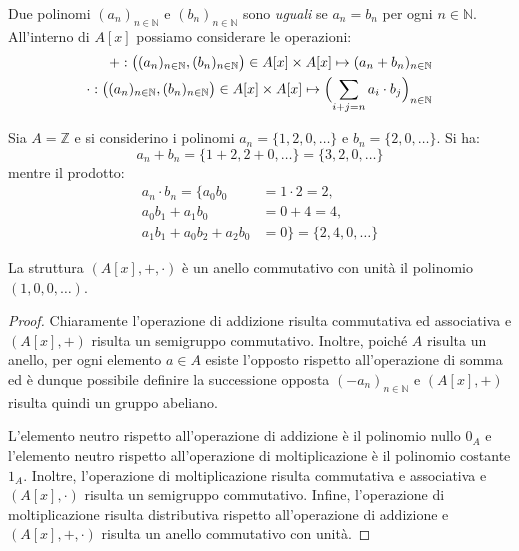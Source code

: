 Due polinomi $(a_{n})_{n \in \mathbb{N}}$ e $(b_{n})_{n \in \mathbb{N}}$ sono
\textit{uguali} se $a_{n} = b_{n}$ per ogni $n \in \mathbb{N}$. All'interno di $A[x]$ possiamo considerare le operazioni:
\begin{eqnarray}
	+: \bigl((a_{n})_{n \in \mathbb{N}},(b_{n})_{n \in \mathbb{N}}\bigr) \in A[x] \times A[x] \mapsto (a_{n}+b_{n})_{n \in \mathbb{N}}\\
	\cdot:\bigl((a_{n})_{n \in \mathbb{N}},(b_{n})_{n \in \mathbb{N}}\bigr) \in A[x] \times A[x] \mapsto \Bigl(\sum_{i+j=n} a_{i} \cdot b_{j}\Bigr)_{n \in \mathbb{N}}
\end{eqnarray}


\begin{example}
	Sia $A= \mathbb{Z}$ e si considerino i polinomi $a_{n}=\{1, 2, 0, \ldots\}$ e $b_{n}=\{2,0,\ldots\}$. Si ha:
	\begin{displaymath}
		a_{n} + b_{n} = \{1+2, 2+0, \ldots\} = \{3,2,0, \ldots\}
	\end{displaymath}
	mentre il prodotto:
	\begin{align*}
		a_{n} \cdot b_{n} = \{ a_{0}b_{0} &=1 \cdot 2 = 2, \\
		a_{0}b_{1}+a_{1}b_{0}&=0+4 = 4,\\
		a_{1}b_{1}+a_{0}b_{2}+a_{2}b_{0} &= 0\} = \{2,4,0,\ldots\}
	\end{align*}
\end{example}

\begin{propbox}
	La struttura $(A[x],+,\cdot)$ è un anello commutativo con unità il polinomio $(1,0,0,\ldots)$.
\end{propbox}

\begin{proof}
	Chiaramente l'operazione di addizione risulta commutativa ed associativa e $(A[x],+)$ risulta un semigruppo commutativo. Inoltre, poiché $A$ risulta un anello, per ogni elemento $a \in A$ esiste l'opposto rispetto all'operazione di somma ed è dunque possibile definire la successione opposta $(-a_{n})_{n \in \mathbb{N}}$ e $(A[x],+)$ risulta quindi un gruppo abeliano.
	
	L'elemento neutro rispetto all'operazione di addizione è il polinomio nullo $0_{A}$ e l'elemento neutro rispetto all'operazione di moltiplicazione è il polinomio costante $1_{A}$. Inoltre, l'operazione di moltiplicazione risulta commutativa e associativa e $(A[x],\cdot)$ risulta un semigruppo commutativo. Infine, l'operazione di moltiplicazione risulta distributiva rispetto all'operazione di addizione e $(A[x],+,\cdot)$ risulta un anello commutativo con unità.
\end{proof}

